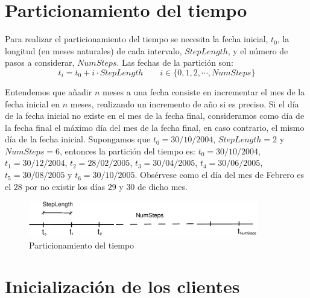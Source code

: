 \section{Particionamiento del tiempo}

Para realizar el particionamiento del tiempo se necesita la fecha inicial, $t_0$,
la longitud (en meses naturales) de cada intervalo, $StepLength$, y el n\'umero
de pasos a considerar, $NumSteps$. Las fechas de la partici\'on son:
\begin{displaymath}
t_i = t_0 + i \cdot StepLength \qquad i \in \{0, 1, 2, \cdots, NumSteps\}
\end{displaymath}

Entendemos que a\~nadir $n$ meses a una fecha consiste en incrementar el
mes de la fecha inicial en $n$ meses, realizando un incremento de a\~no si
es preciso. Si el d\'ia de la fecha inicial no existe en el mes de la fecha
final, consideramos como d\'ia de la fecha final el m\'aximo d\'ia del mes
de la fecha final, en caso contrario, el mismo d\'ia de la fecha inicial.
\newline
\newline
Supongamos que $t_0=30/10/2004$, $StepLength=2$ y $NumSteps=6$, entonces la
partici\'on del tiempo es: $t_0=30/10/2004$, $t_1=30/12/2004$, $t_2=28/02/2005$,
$t_3=30/04/2005$, $t_4=30/06/2005$, $t_5=30/08/2005$ y $t_6=30/10/2005$.
Obs\'ervese como el d\'ia del mes de Febrero es el $28$ por no existir los
d\'ias $29$ y $30$ de dicho mes.

\begin{figure}[!hb]
\begin{center}
\includegraphics[width=10cm,angle=0]{./images/time.eps}
\caption{Particionamiento del tiempo}
\label{timetranches}
\end{center}
\end{figure}


\section{Inicializaci\'on de los clientes}

